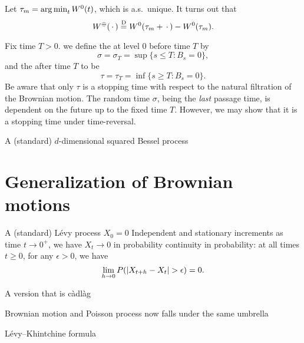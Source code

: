 \begin{namedthm}
    Let $\tau_m = \operatorname*{arg\,min}_t W^{0}(t)$, which is a.s.\ unique. It turns out that \[
        W^\oplus (\,\cdot\,) \stackrel{\mathrm{D}}{=} W^0 (\tau_m + \,\cdot\, ) - W^0 (\tau_m).
    \]
\end{namedthm}

Fix time $T>0$. we define the  at level $0$ before time $T$ by \[\sigma =  \sigma_T = \sup\{s \leq T : B_s  = 0\},\]
and the  after time $T$ to be \[
    \tau = \tau_T = \inf\{s \geq T : B_s = 0\}.
\] Be aware that only $\tau$ is a stopping time with respect to the natural filtration of the Brownian motion. The random time $\sigma$, being the \emph{last} passage time, is dependent on the future up to the fixed time $T$. However, we may show that it is a stopping time under time-reversal.


A (standard) $d$-dimensional squared Bessel process 

\section{Generalization of Brownian motions}

\begin{defn}
    A (standard) Lévy process 
    $X_0 = 0$
    Independent and stationary increments
    as time $t \to 0^+$, we have $X_t\to 0$ in probability
    continuity in probability: at all times $t\geq 0$, for any $\epsilon>0$, we have \[
        \lim_{h \to 0} P(\lvert X_{t+h} - X_t \rvert > \epsilon) = 0.
    \]
\end{defn}

A version that is càdlàg

Brownian motion and Poisson process now falls under the same umbrella



Lévy--Khintchine formula